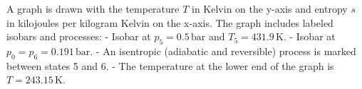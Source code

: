 A graph is drawn with the temperature \( T \) in Kelvin on the y-axis and entropy \( s \) in kilojoules per kilogram Kelvin on the x-axis. The graph includes labeled isobars and processes:  
- Isobar at \( p_5 = 0.5 \, \text{bar} \) and \( T_5 = 431.9 \, \text{K} \).  
- Isobar at \( p_0 = p_6 = 0.191 \, \text{bar} \).  
- An isentropic (adiabatic and reversible) process is marked between states 5 and 6.  
- The temperature at the lower end of the graph is \( T = 243.15 \, \text{K} \).